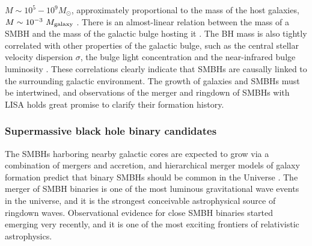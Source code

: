 \documentclass[]{iopart}
\begin{document}
$M\sim 10^5-10^9M_\odot$, approximately proportional to the mass of the host
galaxies, $M\sim 10^{-3}~M_{\rm galaxy}$ \cite{Merritt:2000mi}.
There is an almost-linear relation between the mass of a SMBH and the mass of
the galactic bulge hosting it
\cite{Kormendy:1995er,Magorrian:1998,McLure:2002}. The BH mass is also tightly
correlated with other properties of the galactic bulge, such as the central
stellar velocity dispersion $\sigma$, the bulge light concentration and the
near-infrared bulge luminosity
\cite{Ferrarese:2000se,Marconi:2003hj,Graham:2008uh}.  These correlations
clearly indicate that SMBHs are causally linked to the surrounding galactic
environment. The growth of galaxies and SMBHs must be intertwined, and
observations of the merger and ringdown of SMBHs with LISA holds great promise
to clarify their formation history.

\subsubsection*{Supermassive black hole binary candidates} 

The SMBHs harboring nearby galactic cores are expected to grow via a
combination of mergers and accretion, and hierarchical merger models of galaxy
formation predict that binary SMBHs should be common in the Universe
\cite{Merritt:2004gc,Hopkins:2005fb,Hopkins:2005ms}. The merger of SMBH
binaries is one of the most luminous gravitational wave events in the
universe, and it is the strongest conceivable astrophysical source of ringdown
waves. Observational evidence for close SMBH binaries started emerging very
recently, and it is one of the most exciting frontiers of relativistic
astrophysics.
\end{document}
